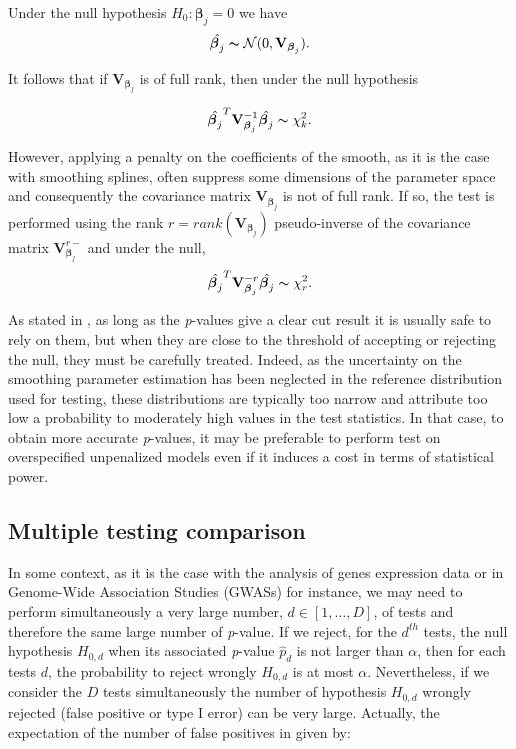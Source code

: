 \documentclass[]{book}
\begin{document}
Under the null hypothesis \(H_0: \boldsymbol{\beta}_j = 0\) we have
\[\hat{\boldsymbol{\beta}_j} \thicksim \mathcal{N}(0, \mathbf{V}_{\boldsymbol{\beta}_j}).\]

It follows that if \(\mathbf{V}_{\boldsymbol{\beta}_j}\) is of full rank, then under the null
hypothesis

\[\hat{\boldsymbol{\beta}_j}^T \mathbf{V}_{\boldsymbol{\beta}_j}^{-1} \hat{\boldsymbol{\beta}_j} \thicksim \chi^2_k.\]

However, applying a penalty on the coefficients of the smooth, as it is
the case with smoothing splines, often suppress some dimensions of the
parameter space and consequently the covariance matrix \(\mathbf{V}_{\boldsymbol{\beta}_j}\)
is not of full rank. If so, the test is performed using the rank
\(r = rank(\mathbf{V}_{\boldsymbol{\beta}_j})\) pseudo-inverse of the covariance matrix
\(\mathbf{V}_{\boldsymbol{\beta}_j}^{r-}\) and under the null,
\[\hat{\boldsymbol{\beta}_j}^T \mathbf{V}_{\boldsymbol{\beta}_j}^{-r} \hat{\boldsymbol{\beta}_j} \thicksim \chi^2_r.\]

As stated in \citep{wood_generalized_2006}, as long as the \emph{p}-values give a
clear cut result it is usually safe to rely on them, but when they are
close to the threshold of accepting or rejecting the null, they must be
carefully treated. Indeed, as the uncertainty on the smoothing parameter
estimation has been neglected in the reference distribution used for
testing, these distributions are typically too narrow and attribute too
low a probability to moderately high values in the test statistics. In
that case, to obtain more accurate \emph{p}-values, it may be preferable to
perform test on overspecified unpenalized models even if it induces a
cost in terms of statistical power.

\hypertarget{multiple}{%
\subsection{Multiple testing comparison}\label{multiple}}

In some context, as it is the case with the analysis of genes expression
data or in Genome-Wide Association Studies (GWASs) for instance, we may
need to perform simultaneously a very large number, \(d \in [1,\dots,D]\),
of tests and therefore the same large number of \emph{p}-value. If we reject,
for the \(d^{th}\) tests, the null hypothesis \(H_{0,d}\) when its
associated \emph{p}-value \(\hat{p}_d\) is not larger than \(\alpha\), then for
each tests \(d\), the probability to reject wrongly \(H_{0,d}\) is at most
\(\alpha\). Nevertheless, if we consider the \(D\) tests simultaneously the
number of hypothesis \(H_{0,d}\) wrongly rejected (false positive or type
I error) can be very large. Actually, the expectation of the number of
false positives in given by:
\end{document}
